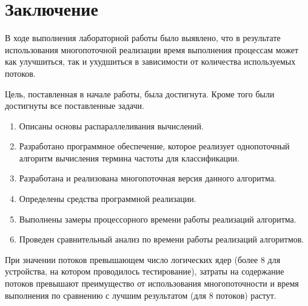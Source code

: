 \chapter*{Заключение}

В ходе выполнения лабораторной работы было выявлено, что в результате использования многопоточной реализации время выполнения процессам может как улучшиться, так и ухудшиться в зависимости от количества используемых потоков.

Цель, поставленная в начале работы, была достигнута. 
Кроме того были достигнуты все поставленные задачи.
\begin{enumerate}
	\item Описаны основы распараллеливания вычислений.
	\item Разработано программное обеспечение, которое реализует однопоточный алгоритм вычисления термина частоты для классификации.
	\item Разработана и реализована многопоточная версия данного алгоритма.
	\item Определены средства программной реализации.
	\item Выполнены замеры процессорного времени работы реализаций алгоритма.
	\item Проведен сравнительный анализ по времени работы реализаций алгоритмов.
\end{enumerate}

При значении потоков превышающем число логических ядер (более 8 для устройства, на котором проводилось тестирование), затраты на содержание потоков превышают преимущество от использования многопоточности и время выполнения по сравнению с лучшим результатом (для 8 потоков) растут.